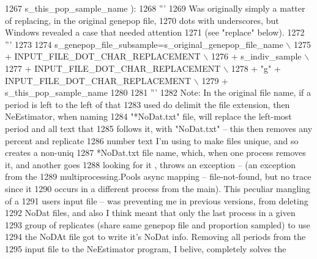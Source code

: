 \begin{DoxyCode}
1267                                                     s\_this\_pop\_sample\_name ):
1268     \textcolor{stringliteral}{'''}
1269 \textcolor{stringliteral}{    Was originally simply a matter of replacing, in the original genepop file,}
1270 \textcolor{stringliteral}{    dots with underscores, but Windows revealed a case that needed attention }
1271 \textcolor{stringliteral}{    (see "replace" below).}
1272 \textcolor{stringliteral}{    '''}
1273 
1274     s\_genepop\_file\_subsample=s\_original\_genepop\_file\_name \(\backslash\)
1275                                 + INPUT\_FILE\_DOT\_CHAR\_REPLACEMENT \(\backslash\)
1276                                 +  s\_indiv\_sample \(\backslash\)
1277                                 + INPUT\_FILE\_DOT\_CHAR\_REPLACEMENT \(\backslash\)
1278                                 + \textcolor{stringliteral}{"g"} + INPUT\_FILE\_DOT\_CHAR\_REPLACEMENT \(\backslash\)
1279                                 + s\_this\_pop\_sample\_name
1280     
1281     \textcolor{stringliteral}{'''}
1282 \textcolor{stringliteral}{    Note: In the original file name, if a period is left to the left of that}
1283 \textcolor{stringliteral}{    used do delimit the file extension, then NeEstimator, when naming}
1284 \textcolor{stringliteral}{    "*NoDat.txt" file, will replace the left-most period and all text that}
1285 \textcolor{stringliteral}{    follows it,  with "NoDat.txt" -- this then removes any percent and replicate}
1286 \textcolor{stringliteral}{    number text I'm using to make files unique, and so creates a non-uniq}
1287 \textcolor{stringliteral}{    *NoDat.txt file name, which, when one process removes it, and another goes}
1288 \textcolor{stringliteral}{    looking for it , throws an exception -- (an exception from the}
1289 \textcolor{stringliteral}{    multiprocessing.Pools async mapping -- file-not-found, but no trace since it}
1290 \textcolor{stringliteral}{    occurs in a different process from the main).  This peculiar mangling of a}
1291 \textcolor{stringliteral}{    users input file -- was preventing me in previous versions, from deleting}
1292 \textcolor{stringliteral}{    NoDat files, and also I think meant that only the last process in a given}
1293 \textcolor{stringliteral}{    group of replicates (share same genepop file and proportion sampled) to use}
1294 \textcolor{stringliteral}{    the NoDAt file got to write it's NoDat info.  Removing all periods from the}
1295 \textcolor{stringliteral}{    input file to the NeEstimator program, I belive, completely solves the}

\end{DoxyCode}
